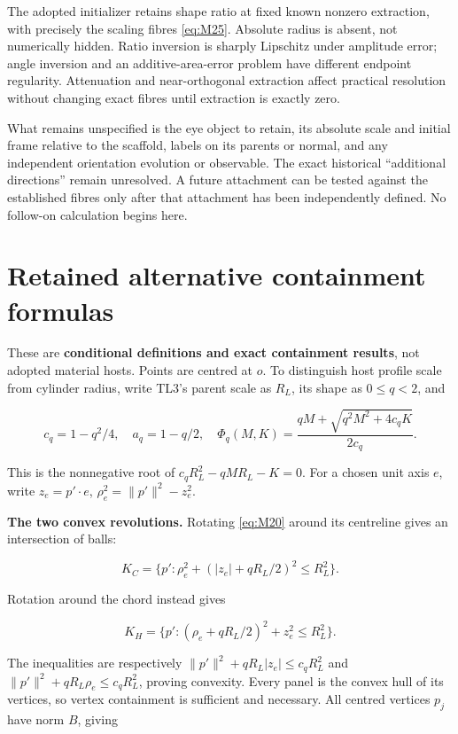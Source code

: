 \documentclass[11pt,a4paper]{article}
\begin{document}
The adopted initializer retains shape ratio at fixed known nonzero extraction, with precisely the scaling fibres \eqref{eq:M25}. Absolute radius is absent, not numerically hidden. Ratio inversion is sharply Lipschitz under amplitude error; angle inversion and an additive-area-error problem have different endpoint regularity. Attenuation and near-orthogonal extraction affect practical resolution without changing exact fibres until extraction is exactly zero.

What remains unspecified is the eye object to retain, its absolute scale and initial frame relative to the scaffold, labels on its parents or normal, and any independent orientation evolution or observable. The exact historical \textquotedblleft{}additional directions\textquotedblright{} remain unresolved. A future attachment can be tested against the established fibres only after that attachment has been independently defined. No follow-on calculation begins here.

\clearpage\appendix
\section{Retained alternative containment formulas}

These are \textbf{conditional definitions and exact containment results}, not adopted material hosts. Points are centred at \(o\). To distinguish host profile scale from cylinder radius, write TL3's parent scale as \(R_L\), its shape as \(0\le q<2\), and

\[
c_q=1-q^2/4,\quad a_q=1-q/2,\quad
\Phi_q(M,K)=\frac{qM+\sqrt{q^2M^2+4c_qK}}{2c_q}.
\tag{MA1}\label{eq:MA1}
\]

This is the nonnegative root of \(c_qR_L^2-qMR_L-K=0\). For a chosen unit axis \(e\), write \(z_e=p'\cdot e\), \(\rho_e^2=\|p'\|^2-z_e^2\).

\textbf{The two convex revolutions.} Rotating \eqref{eq:M20} around its centreline gives an intersection of balls:

\[
K_C=\{p':\rho_e^2+(|z_e|+qR_L/2)^2\le R_L^2\}.
\tag{MA2}\label{eq:MA2}
\]

Rotation around the chord instead gives

\[
K_H=\{p':(\rho_e+qR_L/2)^2+z_e^2\le R_L^2\}.
\tag{MA3}\label{eq:MA3}
\]

The inequalities are respectively \(\|p'\|^2+qR_L|z_e|\le c_qR_L^2\) and \(\|p'\|^2+qR_L\rho_e\le c_qR_L^2\), proving convexity. Every panel is the convex hull of its vertices, so vertex containment is sufficient and necessary. All centred vertices \(p_j\) have norm \(B\), giving
\end{document}
